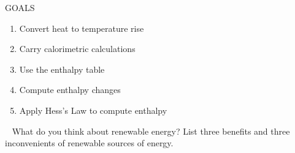 \documentclass[main.tex]{subfiles}
\begin{document}
\begin{marginfigure}%
\begin{mytcbox}{GOALS}
\begin{enumerate}[label=\protect\circled{\color{white}\arabic*}]
\item Convert heat to temperature rise
\item Carry calorimetric calculations
\item Use the enthalpy table
\item Compute enthalpy changes
\item Apply Hess's Law to compute enthalpy
\end{enumerate}
\end{mytcbox}
\vspace{1cm}
\begin{tcolorbox}[enhanced,colback=red!5!white,colframe=black!50!red,boxrule=1pt,
  arc=0pt,outer arc=0pt,drop heavy lifted shadow]
\faGears\ 
 What do you think about renewable energy? List three benefits and three inconvenients of renewable sources of energy. \end{tcolorbox}

\end{marginfigure}%
\end{document}
